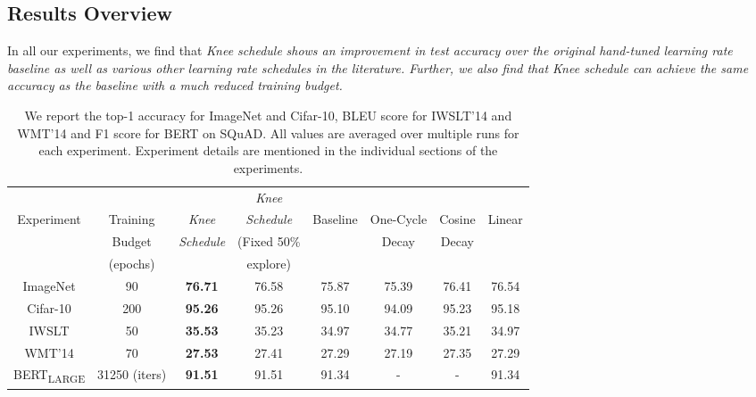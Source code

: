 \documentclass[twoside,11pt]{article}
\newcommand{\lrschedule}{\textit{Knee schedule}}
\begin{document}
\subsection{Results Overview}

In all our experiments, we find that \lrschedule{} {\it shows an improvement in test accuracy over the original hand-tuned learning rate baseline as well as various other learning rate schedules in the literature. Further, we also find that \lrschedule{} can achieve the same accuracy as the baseline with a much reduced training budget.}


\begin{table*}[ht]
\small
\centering
{\setlength{\extrarowheight}{1pt}

\caption{We report the top-1 accuracy for ImageNet and Cifar-10, BLEU score for IWSLT'14 and WMT'14 and F1 score for BERT on SQuAD. All values are averaged over multiple runs for each experiment.
Experiment details are mentioned in the individual sections of the experiments.}

\label{tab:all_results_combined}

\begin{tabular}{ccc@{\hspace{.95\tabcolsep}}c@{\hspace{.75\tabcolsep}}cccc}
\toprule
&          &               &   \textit{Knee}     &          &           &        &    \\
Experiment & Training & \textit{Knee} &  \textit{Schedule}  & Baseline & One-Cycle & Cosine & Linear \\
           & Budget   & \textit{Schedule} & (Fixed 50\%     &              & Decay  & Decay \\
           & (epochs) &                   &  explore)     &              &         &       \\
\midrule
ImageNet    & 90 & \textbf{76.71}  & 76.58  & 75.87 & 75.39 & 76.41 & 76.54 \\
Cifar-10    & 200 & \textbf{95.26} & 95.26 & 95.10 & 94.09 & 95.23 & 95.18 \\
IWSLT       & 50 & \textbf{35.53}  & 35.23 & 34.97 & 34.77 & 35.21  & 34.97  \\
WMT'14       & 70 & \textbf{27.53} & 27.41 & 27.29 & 27.19 & 27.35  & 27.29  \\ 
BERT\textsubscript{LARGE}    & 31250 (iters) & \textbf{91.51} & 91.51 & 91.34 & - & -  & 91.34  \\ 
\bottomrule
\end{tabular}}
\end{table*}
\end{document}
